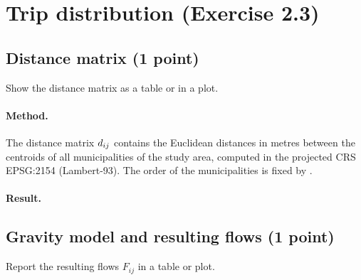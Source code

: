 \section{Trip distribution (Exercise 2.3)}\label{sec:trip-distribution}

\subsection{Distance matrix (1 point)}

\begin{qa}{Show the distance matrix as a table or in a plot.}
\end{qa}

\paragraph{Method.}
The distance matrix $d_{ij}$ contains the Euclidean distances in metres between the centroids of all municipalities of
the study area, computed in the projected CRS EPSG:2154 (Lambert-93). The order of the municipalities is fixed by
. 

\begin{figure}[H]
  \centering
  \caption{}
  \label{fig:distance-matrix}
\end{figure}

\paragraph{Result.}

\subsection{Gravity model and resulting flows (1 point)}

\begin{qa}{Report the resulting flows $F_{ij}$ in a table or plot.}
\end{qa}

